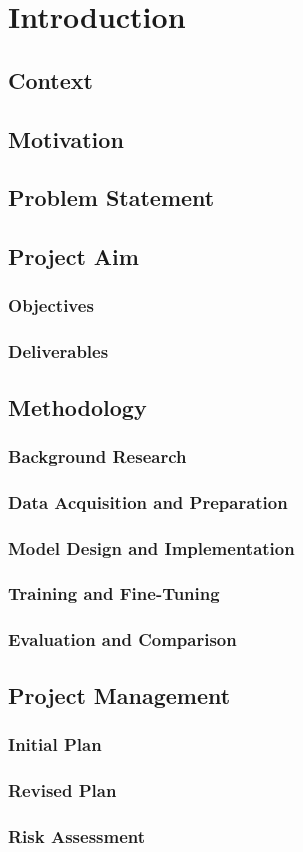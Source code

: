 \chapter{Introduction}
\label{Introduction}

\section{Context}
\section{Motivation}
\section{Problem Statement}
\section{Project Aim}
\subsection{Objectives}
\subsection{Deliverables}
\section{Methodology}
\subsection{Background Research}
\subsection{Data Acquisition and Preparation}
\subsection{Model Design and Implementation}
\subsection{Training and Fine-Tuning}
\subsection{Evaluation and Comparison}
\section{Project Management}
\subsection{Initial Plan}
\subsection{Revised Plan}
\subsection{Risk Assessment}

\cite{parikh1980adaptive}